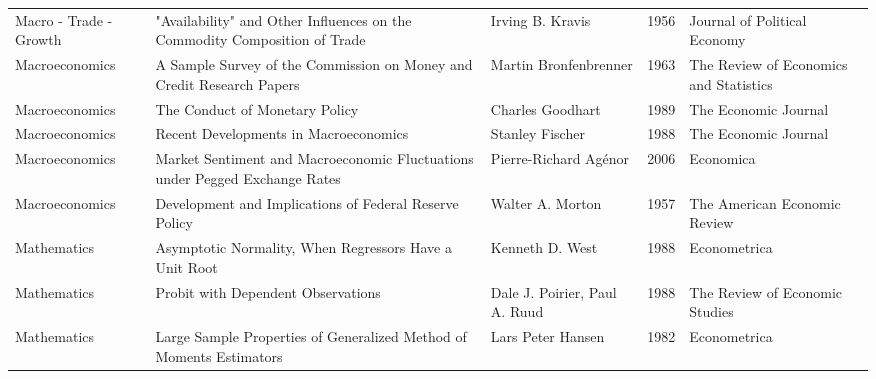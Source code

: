 \begin{xltabular}[p]{\hsize}{sYsrs}
         Macro - Trade - Growth &                                                       "Availability" and Other Influences on the Commodity Composition of Trade &                                              Irving B. Kravis & 1956 &           Journal of Political Economy \\
                 Macroeconomics &                                                           A Sample Survey of the Commission on Money and Credit Research Papers &                                         Martin Bronfenbrenner & 1963 & The Review of Economics and Statistics \\
                 Macroeconomics &                                                                                                  The Conduct of Monetary Policy &                                              Charles Goodhart & 1989 &                   The Economic Journal \\
                 Macroeconomics &                                                                                           Recent Developments in Macroeconomics &                                               Stanley Fischer & 1988 &                   The Economic Journal \\
                 Macroeconomics &                                                     Market Sentiment and Macroeconomic Fluctuations under Pegged Exchange Rates &                                         Pierre-Richard Agénor & 2006 &                              Economica \\
                 Macroeconomics &                                                                          Development and Implications of Federal Reserve Policy &                                              Walter A. Morton & 1957 &           The American Economic Review \\
                    Mathematics &                                                                          Asymptotic Normality, When Regressors Have a Unit Root &                                               Kenneth D. West & 1988 &                           Econometrica \\
                    Mathematics &                                                                                              Probit with Dependent Observations &                                 Dale J. Poirier, Paul A. Ruud & 1988 &         The Review of Economic Studies \\
                    Mathematics &                                                             Large Sample Properties of Generalized Method of Moments Estimators &                                             Lars Peter Hansen & 1982 &                           Econometrica \\

\end{xltabular}
